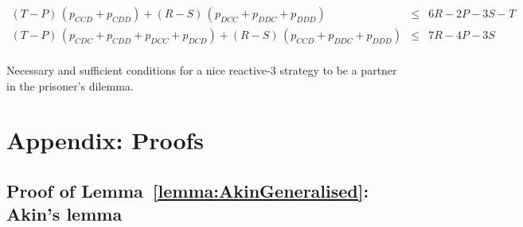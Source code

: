 \documentclass[9pt,twoside,lineno]{pnas-new}
\theoremstyle{plainCl1}
\theoremstyle{plainCl2}
\begin{document}
\begin{table}[t!]
{{\begin{equation*}
\begin{array}{rcl}
    (T - P)\,(p_{CCD} + p_{CDD}) + (R - S)\,(p_{DCC} + p_{DDC} + p_{DDD}) & \le & 6 R \!-\! 2 P \!-\! 3 S \!-\! T \\ [0.2cm]
    (T - P)\,(p_{CDC} + p_{CDD} + p_{DCC} + p_{DCD}) + (R - S)\,(p_{CCD} + p_{DDC} + p_{DDD}) & \le & 7 R \!-\! 4 P \!-\! 3 S \\ [0.2cm]
 \end{array}
 \end{equation*}
 }}
 \caption{Necessary and sufficient conditions for a nice reactive-3 strategy to be a partner in the  prisoner's dilemma.}
 \label{Tab:PartnerReactiveThreePD}
 \end{table}



\clearpage
\newpage




\section{Appendix: Proofs}
\label{section:appendix}


\subsection{Proof of Lemma~\ref{lemma:AkinGeneralised}: Akin's lemma}
\end{document}
